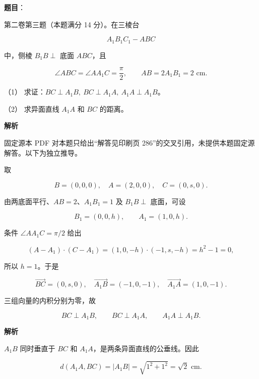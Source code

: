 \begin{answer}

\textbf{题目}：

第二卷第三题（本题满分 14 分）。在三棱台

\nopagebreak[4]
\[
A_1B_1C_1-ABC
\]

中，侧棱 $B_1B\perp$ 底面 $ABC$，且

\nopagebreak[4]
\[
\angle ABC=\angle AA_1C=\frac\pi2,\qquad
AB=2A_1B_1=2\text{ cm}.
\]
\nopagebreak[4]
\begin{center}\end{center}
\nopagebreak[4]
（1） 求证：$BC\perp A_1B,\ BC\perp A_1A,\ A_1A\perp A_1B$。

（2） 求异面直线 $A_1A$ 和 $BC$ 的距离。

\textbf{解析}


固定源本 PDF 对本题只给出“解答见印刷页 286”的交叉引用，未提供本题固定源解答。以下为独立推导。

取

\nopagebreak[4]
\[
B=(0,0,0),\quad A=(2,0,0),\quad C=(0,s,0).
\]

由两底面平行、$AB=2$、$A_1B_1=1$ 及 $B_1B\perp$ 底面，可设

\nopagebreak[4]
\[
B_1=(0,0,h),\qquad A_1=(1,0,h).
\]

条件 $\angle AA_1C=\pi/2$ 给出

\nopagebreak[4]
\[
(A-A_1)\cdot(C-A_1)
=(1,0,-h)\cdot(-1,s,-h)=h^2-1=0,
\]

所以 $h=1$。于是

\nopagebreak[4]
\[
\overrightarrow{BC}=(0,s,0),\quad
\overrightarrow{A_1B}=(-1,0,-1),\quad
\overrightarrow{A_1A}=(1,0,-1).
\]

三组向量的内积分别为零，故

\nopagebreak[4]
\[
BC\perp A_1B,\qquad
BC\perp A_1A,\qquad
A_1A\perp A_1B.
\]


\textbf{解析}

$A_1B$ 同时垂直于 $BC$ 和 $A_1A$，是两条异面直线的公垂线。因此

\nopagebreak[4]
\[
d(A_1A,BC)=|A_1B|=\sqrt{1^2+1^2}=\sqrt2\text{ cm}.
\]



\end{answer}
